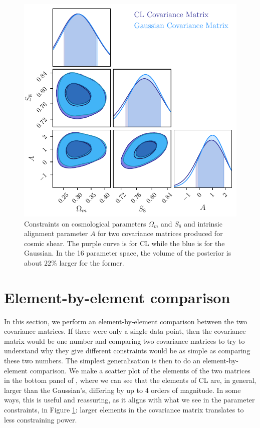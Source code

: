 \documentclass[twocolumn]{\docclass}
\newcommand{\rf}[1]{\ref{fig:#1}}
\begin{document}
	\begin{figure}
		\includegraphics[width=0.9\columnwidth]{Y1_Comparison/Y1_om-S8A.pdf}
		\caption{Constraints on cosmological parameters $\Omega_m$ and $S_8$ and intrinsic alignment parameter $A$ for two covariance matrices produced for cosmic shear. The purple curve is for CL while the blue is for the Gaussian. In the 16 parameter space, the volume of the posterior is about $22\%$ larger for the former. \label{fig:y3-comparison}}
	\end{figure}
	
	
	
	\section{Element-by-element comparison}
	\label{sec:one-to-one}
	In this section, we perform an element-by-element comparison between the two covariance matrices. If there were only a single data point, then the covariance matrix would be one number and comparing two covariance matrices to try to understand why they give different constraints would be as simple as comparing these two numbers.  The simplest generalisation is then to do an element-by-element comparison. We make a scatter plot of the elements of the two matrices in the bottom panel of , where we can see that the elements of CL are, in general, larger than the Gaussian's, differing by up to 4 orders of magnitude. In some ways, this is useful and reassuring, as it aligns with what we see in the parameter constraints, in Figure \rf{y3-comparison}: larger elements in the covariance matrix translates to less constraining power.
	
\end{document}

